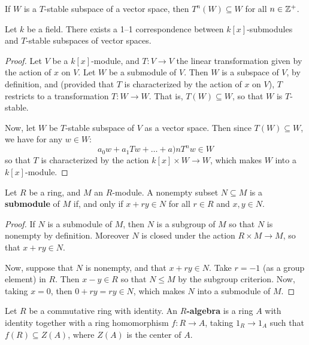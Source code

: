 \begin{definition}
\begin{lemma}\label{lemma_4.1.2}
  If $W$ is a $T$-stable subspace of a vector space, then $T^n(W)
  \subseteq W$ for all $n \in \mathbb{Z}^+$.
\end{lemma}

\begin{lemma}\label{lemma_4.1.3}
  Let $k$ be a field. There exists a 1--1 correspondence between
  $k[x]$-submodules and $T$-stable subspaces of vector spaces.
\end{lemma}
\begin{proof}
  Let $V$ be a $k[x]$-module, and $T:V \xrightarrow{} V$ the linear
  transformation given by the action of $x$ on  $V$. Let  $W$ be a
  submodule of $V$. Then $W$ is a subspace of $V$, by definition, and
  (provided that $T$ is characterized by the action of $x$ on $V$),
  $T$ restricts to a transformation  $T:W \xrightarrow{} W$. That is,
  $T(W) \subseteq W$, so that $W$ is  $T$-stable.

  Now, let $W$ be $T$-stable subspace of $V$ as a vector space. Then
  since $T(W) \subseteq W$, we have for any $w \in W$:
  \begin{equation*}
    a_0w+a_1Tw+\dots+a)nT^nw \in W
  \end{equation*}
  so that $T$ is characterized by the action  $k[x] \times W
  \xrightarrow{} W$, which makes $W$ into a $k[x]$-module.
\end{proof}

\begin{theorem}\label{theorem_4.1.4}
  Let $R$ be a ring, and  $M$ an $R$-module. A nonempty subset $N
  \subseteq M$ is a \textbf{submodule} of $M$ if, and only if  $x+ry
  \in N$ for all $r \in R$ and $x,y \in N$.
\end{theorem}
\begin{proof}
  If $N$ is a submodule of $M$, then $N$ is a subgroup of $M$ so that
  $N$ is nonempty by definition. Moreover $N$ is closed under the
  action $R \times M \xrightarrow{} M$, so that $x+ry \in N$.

  Now, suppose that $N$ is nonempty, and that  $x+ry \in N$. Take
  $r=-1$ (as a group element) in $R$. Then $x-y \in R$ so that $N \leq
  M$ by the subgroup criterion. Now, taking $x=0$, then  $0+ry=ry \in
  N$, which makes $N$ into a submodule of $M$.
\end{proof}

\begin{definition}
  Let $R$ be a commutative ring with identity. An
  \textbf{$R$-algebra} is a ring $A$ with identity together with a
  ring homomorphism $f:R \xrightarrow{} A$, taking $1_R \xrightarrow{}
  1_A$ such that $f(R) \subseteq Z(A)$, where $Z(A)$ is the center of
  $A$.
\end{definition}


\end{definition}
